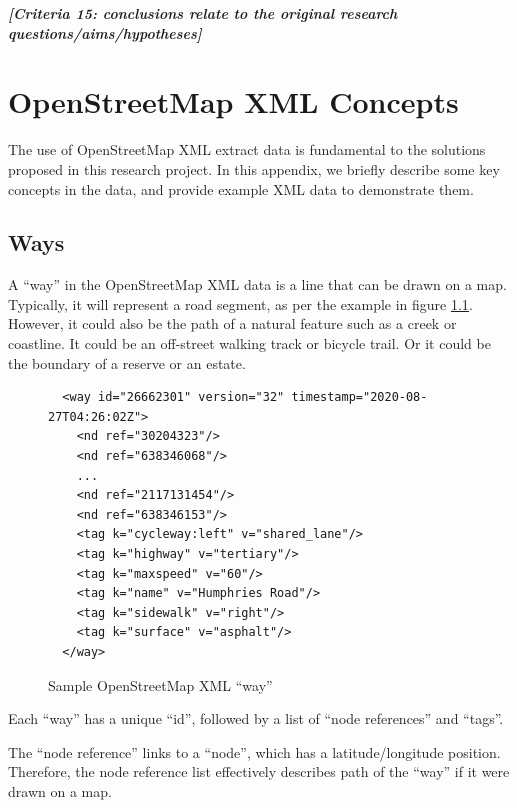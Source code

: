 \documentclass[11pt,twoside]{report}
\newcommand{\remark}[1]{{\bf \em [\marginpar{$\Leftarrow$}#1]}}
\begin{document}
\remark{Criteria 15: conclusions relate to the original research questions/aims/hypotheses}






\appendix

\chapter{OpenStreetMap XML Concepts}
\label{a:osm_concepts}

The use of OpenStreetMap XML extract data is fundamental to the solutions proposed in this research project.  In this appendix, we briefly describe some key concepts in the data, and provide example XML data to demonstrate them.

\section{Ways}
\label{osm:ways}

A ``way'' in the OpenStreetMap XML data is a line that can be drawn on a map.  Typically, it will represent a road segment, as per the example in figure \ref{xml:way_st}.  However, it could also be the path of a natural feature such as a creek or coastline.  It could be an off-street walking track or bicycle trail.  Or it could be the boundary of a reserve or an estate.

\begin{figure}[t]
\centering
\begin{verbatim}
  <way id="26662301" version="32" timestamp="2020-08-27T04:26:02Z">
    <nd ref="30204323"/>
    <nd ref="638346068"/>
    ...
    <nd ref="2117131454"/>
    <nd ref="638346153"/>
    <tag k="cycleway:left" v="shared_lane"/>
    <tag k="highway" v="tertiary"/>
    <tag k="maxspeed" v="60"/>
    <tag k="name" v="Humphries Road"/>
    <tag k="sidewalk" v="right"/>
    <tag k="surface" v="asphalt"/>
  </way>
\end{verbatim}
\caption{Sample OpenStreetMap XML ``way''}
\label{xml:way_st}
\end{figure}

Each ``way'' has a unique ``id'', followed by a list of ``node references'' and ``tags''.

The ``node reference'' links to a ``node'', which has a latitude/longitude position.  Therefore, the node reference list effectively describes path of the ``way'' if it were drawn on a map.
\end{document}
